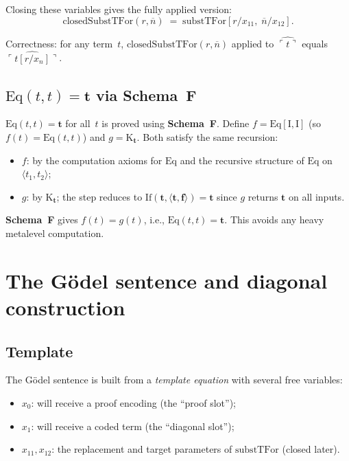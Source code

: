\documentclass[11pt]{article}
\newcommand{\pair}[2]{\langle #1, #2 \rangle}
\newcommand{\true}{\mathbf{t}}
\newcommand{\false}{\mathbf{f}}
\newcommand{\SchemaF}{\textbf{Schema~F}}
\newcommand{\nat}[1]{\overline{#1}}
\begin{document}
Closing these variables gives the fully applied version:
\[
  \mathrm{closedSubstTFor}(r, \nat{n}) \;=\;
  \mathrm{substTFor}[r/x_{11},\; \nat{n}/x_{12}].
\]

Correctness: for any term~$t$,
$\mathrm{closedSubstTFor}(r, \nat{n})$ applied to
$\widehat{\ulcorner t \urcorner}$
equals $\widehat{\ulcorner t[r/x_n] \urcorner}$.

\subsection{$\mathrm{Eq}(t, t) = \true$ via \SchemaF}

$\mathrm{Eq}(t, t) = \true$ for all~$t$ is proved using \SchemaF.
Define $f = \mathrm{Eq}[\mathrm{I}, \mathrm{I}]$
(so $f(t) = \mathrm{Eq}(t,t)$) and $g = \mathrm{K}_\true$.
Both satisfy the same recursion:
\begin{itemize}
\item $f$: by the computation axioms for $\mathrm{Eq}$ and the
  recursive structure of $\mathrm{Eq}$ on $\pair{t_1}{t_2}$;
\item $g$: by $\mathrm{K}_\true$; the step reduces to
  $\mathrm{If}(\true, \pair{\true}{\false}) = \true$ since $g$
  returns $\true$ on all inputs.
\end{itemize}
\SchemaF{} gives $f(t) = g(t)$, i.e., $\mathrm{Eq}(t,t) = \true$.
This avoids any heavy metalevel computation.

\section{The G\"odel sentence and diagonal construction}

\subsection*{Template}

The G\"odel sentence is built from a \emph{template equation}
with several free variables:
\begin{itemize}
\item $x_0$: will receive a proof encoding (the ``proof slot'');
\item $x_1$: will receive a coded term (the ``diagonal slot'');
\item $x_{11}, x_{12}$: the replacement and target parameters of
  $\mathrm{substTFor}$ (closed later).
\end{itemize}
\end{document}
